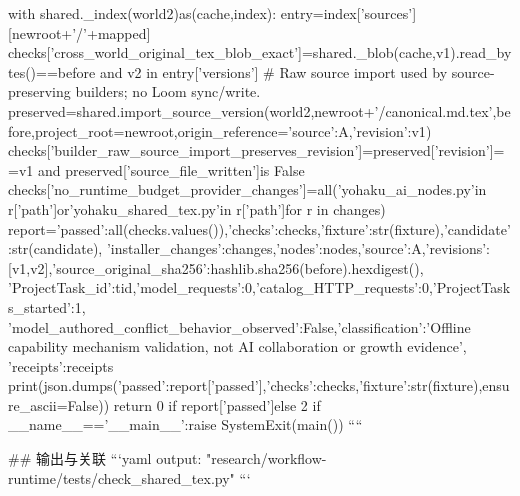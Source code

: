     with shared._index(world2)as(cache,index):
        entry=index['sources'][newroot+'/'+mapped]
        checks['cross_world_original_tex_blob_exact']=shared._blob(cache,v1).read_bytes()==before and v2 in entry['versions']
    # Raw source import used by source-preserving builders; no Loom sync/write.
    preserved=shared.import_source_version(world2,newroot+'/canonical.md.tex',before,project_root=newroot,origin_reference={'source':A,'revision':v1})
    checks['builder_raw_source_import_preserves_revision']=preserved['revision']==v1 and preserved['source_file_written']is False
    checks['no_runtime_budget_provider_changes']=all('yohaku_ai_nodes.py'in r['path']or'yohaku_shared_tex.py'in r['path']for r in changes)
    report={'passed':all(checks.values()),'checks':checks,'fixture':str(fixture),'candidate':str(candidate),
            'installer_changes':changes,'nodes':nodes,'source':A,'revisions':[v1,v2],'source_original_sha256':hashlib.sha256(before).hexdigest(),
            'ProjectTask_id':tid,'model_requests':0,'catalog_HTTP_requests':0,'ProjectTasks_started':1,
            'model_authored_conflict_behavior_observed':False,'classification':'Offline capability mechanism validation, not AI collaboration or growth evidence',
            'receipts':receipts}
    print(json.dumps({'passed':report['passed'],'checks':checks,'fixture':str(fixture)},ensure_ascii=False))
    return 0 if report['passed']else 2
if __name__=='__main__':raise SystemExit(main())
````

## 输出与关联
```yaml
output: "research/workflow-runtime/tests/check_shared_tex.py"
```
